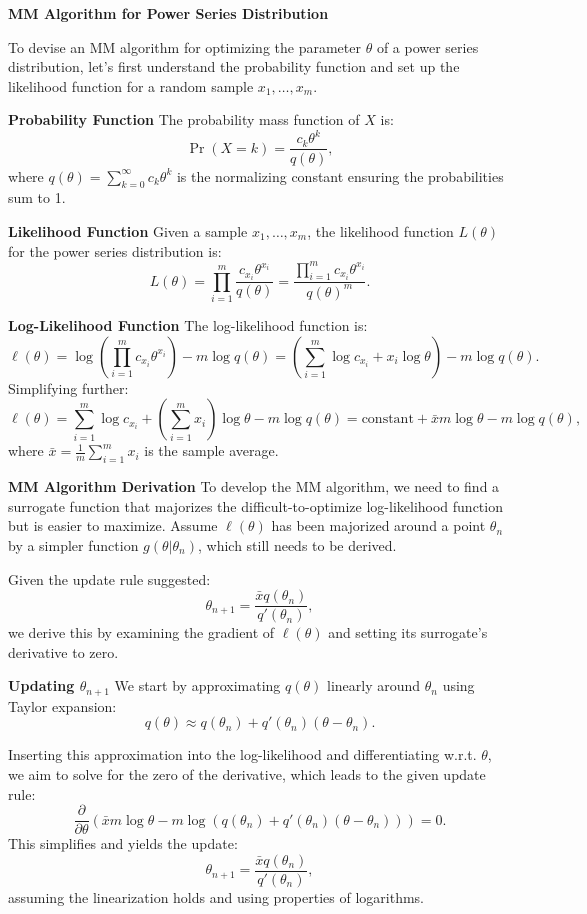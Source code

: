 \documentclass[8pt]{article}
\begin{document}
\textbf{MM Algorithm for Power Series Distribution}

To devise an MM algorithm for optimizing the parameter \(\theta\) of a power series distribution, let's first understand the probability function and set up the likelihood function for a random sample \(x_1, \ldots, x_m\).

\textbf{Probability Function}
The probability mass function of \(X\) is:
\[
\Pr(X = k) = \frac{c_k \theta^k}{q(\theta)},
\]
where \(q(\theta) = \sum_{k=0}^\infty c_k \theta^k\) is the normalizing constant ensuring the probabilities sum to 1.

\textbf{Likelihood Function}
Given a sample \(x_1, \ldots, x_m\), the likelihood function \(L(\theta)\) for the power series distribution is:
\[
L(\theta) = \prod_{i=1}^m \frac{c_{x_i} \theta^{x_i}}{q(\theta)} = \frac{\prod_{i=1}^m c_{x_i} \theta^{x_i}}{q(\theta)^m}.
\]

\textbf{Log-Likelihood Function}
The log-likelihood function is:
\[
\ell(\theta) = \log \left(\prod_{i=1}^m c_{x_i} \theta^{x_i}\right) - m \log q(\theta) = \left(\sum_{i=1}^m \log c_{x_i} + x_i \log \theta \right) - m \log q(\theta).
\]
Simplifying further:
\[
\ell(\theta) = \sum_{i=1}^m \log c_{x_i} + \left(\sum_{i=1}^m x_i\right) \log \theta - m \log q(\theta) = \text{constant} + \bar{x} m \log \theta - m \log q(\theta),
\]
where \(\bar{x} = \frac{1}{m} \sum_{i=1}^m x_i\) is the sample average.

\textbf{MM Algorithm Derivation}
To develop the MM algorithm, we need to find a surrogate function that majorizes the difficult-to-optimize log-likelihood function but is easier to maximize. Assume \(\ell(\theta)\) has been majorized around a point \(\theta_n\) by a simpler function \(g(\theta | \theta_n)\), which still needs to be derived.

Given the update rule suggested:
\[
\theta_{n+1} = \frac{\bar{x} q(\theta_n)}{q'(\theta_n)},
\]
we derive this by examining the gradient of \(\ell(\theta)\) and setting its surrogate's derivative to zero.

\textbf{Updating \(\theta_{n+1}\)}
We start by approximating \(q(\theta)\) linearly around \(\theta_n\) using Taylor expansion:
\[
q(\theta) \approx q(\theta_n) + q'(\theta_n)(\theta - \theta_n).
\]

Inserting this approximation into the log-likelihood and differentiating w.r.t. \(\theta\), we aim to solve for the zero of the derivative, which leads to the given update rule:
\[
\frac{\partial}{\partial \theta} \left(\bar{x} m \log \theta - m \log (q(\theta_n) + q'(\theta_n)(\theta - \theta_n))\right) = 0.
\]
This simplifies and yields the update:
\[
\theta_{n+1} = \frac{\bar{x} q(\theta_n)}{q'(\theta_n)},
\]
assuming the linearization holds and using properties of logarithms.
\end{document}
